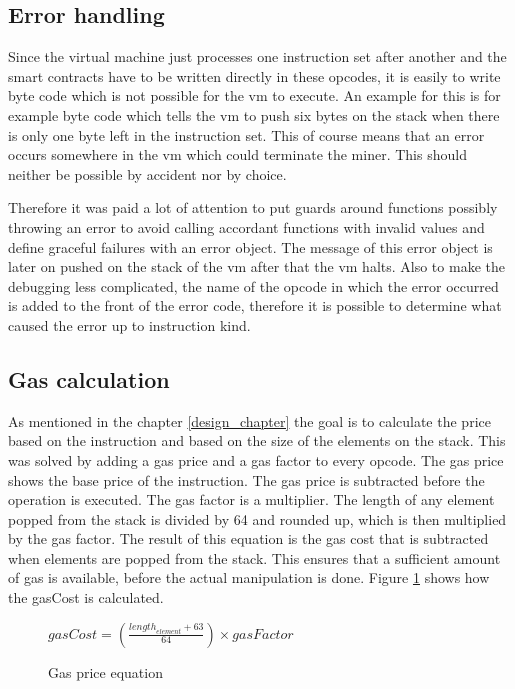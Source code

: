 \subsection{Error handling}
Since the virtual machine just processes one instruction set after another and the smart contracts have to be written directly in these opcodes, it is easily to write byte code which is not possible for the vm to execute. An example for this is for example byte code which tells the vm to push six bytes on the stack when there is only one byte left in the instruction set. This of course means that an error occurs somewhere in the vm which could terminate the miner. This should neither be possible by accident nor by choice.

Therefore it was paid a lot of attention to put guards around functions possibly throwing an error to avoid calling accordant functions with invalid values and define graceful failures with an error object. The message of this error object is later on pushed on the stack of the vm after that the vm halts. Also to make the debugging less complicated, the name of the opcode in which the error occurred is added to the front of the error code, therefore it is possible to determine what caused the error up to instruction kind.

\subsection{Gas calculation}
As mentioned in the chapter \ref{design_chapter} the goal is to calculate the price based on the instruction and based on the size of the elements on the stack. This was solved by adding a gas price and a gas factor to every opcode. The gas price shows the base price of the instruction. The gas price is subtracted before the operation is executed. The gas factor is a multiplier. The length of any element popped from the stack is divided by 64 and rounded up, which is then multiplied by the gas factor. The result of this equation is the gas cost that is subtracted when elements are popped from the stack. This ensures that a sufficient amount of gas is available, before the actual manipulation is done. Figure \ref{gas_factor_calc} shows how the gasCost is calculated.

\begin{figure}[thp]%
    	\centering
		$
		gasCost=\left( \frac { { length }_{ element }+63 }{ 64 }  \right) \times gasFactor
		$
		\caption{Gas price equation}
		\label{gas_factor_calc}
\end{figure}


